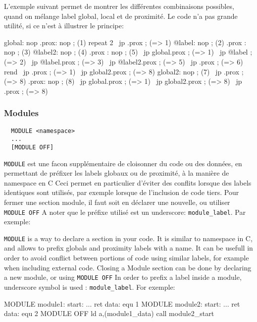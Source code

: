 \begin{xfr}
L'exemple suivant permet de montrer les différentes combinaisons possibles, quand on mélange label global, local et de proximité.
Le code n'a pas grande utilité, si ce n'est à illustrer le principe:
\end{xfr}

\begin{code}
  global: nop
  .prox:  nop ; (1)
  \medskip
  repeat 2
  \           jp .prox ;  (=> 1)
  @label:   nop  ; (2)
  .prox :   nop  ; (3)
  @label2:  nop  ; (4)
  .prox :   nop  ; (5)
  \           jp global.prox  ; (=> 1)
  \           jp @label       ; (=> 2)
  \           jp @label.prox  ; (=> 3)
  \           jp @label2.prox ; (=> 5)
  \           jp .prox        ; (=> 6)
  rend
  \medskip
  \           jp .prox        ; (=> 1)
  \           jp global2.prox ; (=> 8)
  \medskip
  global2:    nop  ; (7)
  \           jp .prox        ; (=> 8)
  .prox:      nop ; (8)
  \           jp global.prox  ; (=> 1)
  \           jp global2.prox ; (=> 8)
  \           jp .prox        ; (=> 8)
  \end{code}


\subsubsection{Modules}\label{MODULES}

\begin{verbatim}
  MODULE <namespace>
  ...
  [MODULE OFF]
\end{verbatim}

\begin{xfr}

\texttt{MODULE} est une facon supplémentaire de cloisonner du code ou des données, en permettant de préfixer les labels globaux ou de proximité, à la manière de namespace en C
Ceci permet en particulier d'éviter des conflits lorsque des labels identiques sont utilisés, par exemple lorsque de l'inclusion de code tiers.
Pour fermer une section module, il faut soit en déclarer une nouvelle, ou utiliser \texttt{MODULE OFF}
A noter que le préfixe utilisé est un underscore: \texttt{module\_label}. Par exemple:
\end{xfr}

\begin{xen}
\texttt{MODULE} is a way to declare a section in your code. It is similar to namespace in C, and allows to prefix globals and proximity labels with a name.
It can be usefull in order to avoid conflict between portions of code using similar labels, for example when including external code.
Closing a Module section can be done by declaring a new module, or using \texttt{MODULE OFF}
In order to prefix a label inside a module, underscore symbol is used : \texttt{module\_label}. For exemple:
\end{xen}

\begin{code}
  MODULE module1:
  start:
    ...
    ret
  data: equ 1
\medskip
MODULE module2:
  start:
    ...
    ret
  data: equ 2
MODULE OFF
\medskip
 ld a,(module1\_data)
 call module2\_start
\end{code}
